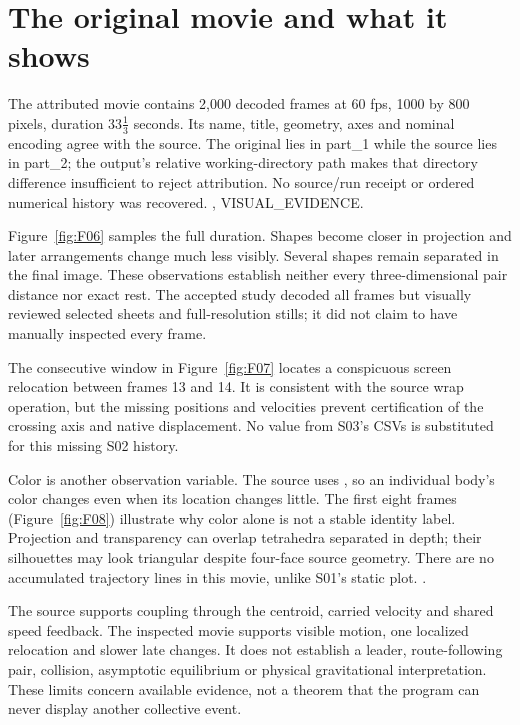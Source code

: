 \section{The original movie and what it shows}
The attributed movie
 contains 2,000 decoded
frames at 60 fps, 1000 by 800 pixels, duration $33\frac13$ seconds.
Its name, title, geometry, axes and nominal encoding agree with the
source. The original lies in part\_1 while the source lies in part\_2;
the output's relative working-directory path makes that directory
difference insufficient to reject attribution.
No source/run receipt or ordered numerical history was recovered.
\cite{construction02}, VISUAL\_EVIDENCE. 

Figure~\ref{fig:F06} samples the full duration. Shapes become closer
in projection and later arrangements change much less visibly.
Several shapes remain separated in the final image. These observations
establish neither every three-dimensional pair distance nor exact rest.
The accepted study decoded all frames but visually reviewed selected
sheets and full-resolution stills; it did not claim to have manually
inspected every frame. 

The consecutive window in Figure~\ref{fig:F07} locates a conspicuous
screen relocation between frames 13 and 14. It is consistent with the
source wrap operation, but the missing positions and velocities prevent
certification of the crossing axis and native displacement. No value
from S03's CSVs is substituted for this missing S02 history.

Color is another observation variable. The source uses
, so an individual body's color
changes even when its location changes little. The first eight frames
(Figure~\ref{fig:F08}) illustrate why color alone is not a stable
identity label. Projection and transparency can overlap tetrahedra
separated in depth; their silhouettes may look triangular despite
four-face source geometry. There are no accumulated trajectory lines
in this movie, unlike S01's static plot.
. 

The source supports coupling through the centroid, carried velocity
and shared speed feedback. The inspected movie supports visible
motion, one localized relocation and slower late changes.
It does not establish a leader, route-following pair, collision,
asymptotic equilibrium or physical gravitational interpretation.
These limits concern available evidence, not a theorem that the
program can never display another collective event. 
\FloatBarrier
